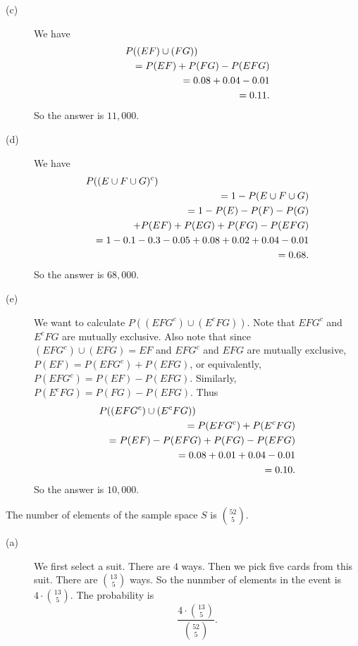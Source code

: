 \begin{description}
\begin{description}
\item[(c)] We have 
\begin{eqnarray*}
\lefteqn{P((EF)\cup (FG))}\\
&&=P(EF)+P(FG)-P(EFG)\\
&&=0.08+0.04-0.01\\
&&=0.11.
\end{eqnarray*}
So the answer is $11,000$.

\item[(d)] We have 
\begin{eqnarray*}
\lefteqn{P((E\cup F\cup G)^{c})}\\
&&=1-P(E\cup F\cup G)\\
&&=1-P(E)-P(F)-P(G)\\
&&\quad +P(EF)+P(EG)+P(FG)-P(EFG)\\
&&=1-0.1-0.3-0.05+0.08+0.02+0.04-0.01\\
&&=0.68.
\end{eqnarray*}
So the answer is $68,000$.

\item[(e)] We want to calculate $P((EFG^{c})\cup (E^{c}FG))$.
Note that $EFG^{c}$ and $E^{c}FG$ are mutually exclusive. 
Also note that since $(EFG^{c})\cup (EFG)=EF$ and $EFG^{c}$ 
and $EFG$ are mutually exclusive, $P(EF)=P(EFG^{c})+P(EFG)$,
or equivalently, $P(EFG^{c})=P(EF)-P(EFG)$. Similarly, 
$P(E^{c}FG)=P(FG)-P(EFG)$. Thus
\begin{eqnarray*}
\lefteqn{P((EFG^{c})\cup (E^{c}FG))}\\
&&=P(EFG^{c})+P(E^{c}FG)\\
&&=P(EF)-P(EFG)+P(FG)-P(EFG)\\
&&=0.08+0.01+0.04-0.01\\
&&=0.10.
\end{eqnarray*}
So the answer is $10,000$.


\end{description}

\item[{\rm 15.}] The number of elements of the sample space $S$ is 
${52\choose 5}$. 

\begin{description}

\item[(a)] We first select a suit. There are $4$ ways. Then 
we pick five cards from this suit. 
There are ${13\choose 5}$ ways. So the nunmber of elements in the 
event is $4\cdot {13\choose 5}$. The probability is 
$$\frac{4\cdot {13\choose 5}}{{52\choose 5}}.$$


\end{description}
\end{description}
